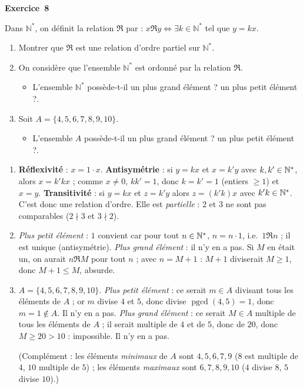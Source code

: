 \documentclass[11pt,a4paper]{article}
\newcommand{\pgcd}{\operatorname{pgcd}}
\newcommand{\eqv}{\mathfrak{R}}
\begin{document}
	\medskip\noindent\textbf{\Large\color{bleu}Exercice~8}\nopagebreak
	\begin{enonce}
		Dans $\mathbb{N}^*$, on définit la relation $\mathfrak{R}$ par : $x \mathfrak{R} y \Leftrightarrow \exists k \in \mathbb{N}^*$ tel que $y=kx$.
		\begin{enumerate}
			\item Montrer que $\mathfrak{R}$ est une relation d'ordre partiel sur $\mathbb{N}^*$.
			\item On considère que l'ensemble $\mathbb{N}^*$ est ordonné par la relation $\mathfrak{R}$.
			\begin{itemize}
				\item L'ensemble $\mathbb{N}^*$ possède-t-il un plus grand élément ? un plus petit élément ?.
			\end{itemize}
			\item Soit $A = \{4, 5, 6, 7, 8, 9, 10\}$.
			\begin{itemize}
				\item L'ensemble $A$ possède-t-il un plus grand élément ? un plus petit élément ?.
			\end{itemize}
		\end{enumerate}
	\end{enonce}
	\begin{corrige}
		\begin{enumerate}
			\item \textbf{Réflexivité} : $x=1\cdot x$. \textbf{Antisymétrie} : si $y=kx$ et $x=k'y$ avec $k,k'\in\mathbb{N}^*$, alors $x=k'kx$ ; comme $x\neq0$, $kk'=1$, donc $k=k'=1$ (entiers $\geq1$) et $x=y$. \textbf{Transitivité} : si $y=kx$ et $z=k'y$ alors $z=(k'k)x$ avec $k'k\in\mathbb{N}^*$. C'est donc une relation d'ordre. Elle est \emph{partielle} : $2$ et $3$ ne sont pas comparables ($2\nmid3$ et $3\nmid2$).
			\item \emph{Plus petit élément} : $1$ convient car pour tout $n\in\mathbb{N}^*$, $n=n\cdot1$, i.e.\ $1\eqv n$ ; il est unique (antisymétrie). \emph{Plus grand élément} : il n'y en a pas. Si $M$ en était un, on aurait $n\eqv M$ pour tout $n$ ; avec $n=M+1$ : $M+1$ diviserait $M\geq1$, donc $M+1\leq M$, absurde.
			\item $A=\{4,5,6,7,8,9,10\}$. \emph{Plus petit élément} : ce serait $m\in A$ divisant tous les éléments de $A$ ; or $m$ divise $4$ et $5$, donc divise $\pgcd(4,5)=1$, donc $m=1\notin A$. Il n'y en a pas. \emph{Plus grand élément} : ce serait $M\in A$ multiple de tous les éléments de $A$ ; il serait multiple de $4$ et de $5$, donc de $20$, donc $M\geq20>10$ : impossible. Il n'y en a pas.
			
			(Complément : les éléments \emph{minimaux} de $A$ sont $4,5,6,7,9$ ($8$ est multiple de $4$, $10$ multiple de $5$) ; les éléments \emph{maximaux} sont $6,7,8,9,10$ ($4$ divise $8$, $5$ divise $10$).)
		\end{enumerate}
	\end{corrige}
	
\end{document}
